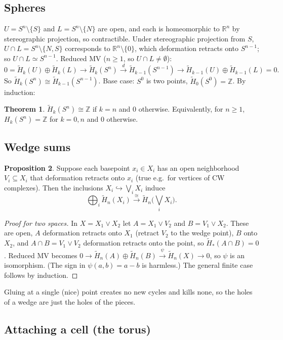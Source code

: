 \documentclass[11pt]{article}
\newcommand{\Z}{\mathbb Z}
\newcommand{\R}{\mathbb R}
\newcommand{\Hred}{\tilde H}
\newcommand{\fig}[2]{\begin{center}\resizebox{#2}{!}{}\end{center}}
\theoremstyle{definition}
\newtheorem{thm}{Theorem}[section]
\newtheorem{prop}[thm]{Proposition}
\begin{document}
\subsection{Spheres}
\fig{mv-sphere}{0.6\textwidth}
$U=S^n\setminus\{S\}$ and $L=S^n\setminus\{N\}$ are open, and each is homeomorphic to $\R^n$ by stereographic projection, so contractible. Under stereographic projection from $S$, $U\cap L=S^n\setminus\{N,S\}$ corresponds to $\R^n\setminus\{0\}$, which deformation retracts onto $S^{n-1}$; so $U\cap L\simeq S^{n-1}$. Reduced MV ($n\ge1$, so $U\cap L\neq\emptyset$):
\[0=\Hred_k(U)\oplus\Hred_k(L)\to\Hred_k(S^n)\xrightarrow{d}\Hred_{k-1}(S^{n-1})\to\Hred_{k-1}(U)\oplus\Hred_{k-1}(L)=0.\]
So $\Hred_k(S^n)\cong\Hred_{k-1}(S^{n-1})$. Base case: $S^0$ is two points, $\Hred_0(S^0)=\Z$. By induction:
\begin{thm}
$\Hred_k(S^n)\cong\Z$ if $k=n$ and $0$ otherwise. Equivalently, for $n\ge1$, $H_k(S^n)=\Z$ for $k=0,n$ and $0$ otherwise.
\end{thm}

\subsection{Wedge sums}
\begin{prop}
Suppose each basepoint $x_i\in X_i$ has an open neighborhood $V_i\subseteq X_i$ that deformation retracts onto $x_i$ (true e.g.\ for vertices of CW complexes). Then the inclusions $X_i\hookrightarrow\bigvee_iX_i$ induce
\[\bigoplus_i\Hred_n(X_i)\xrightarrow{\ \cong\ }\Hred_n\Big(\bigvee_iX_i\Big).\]
\end{prop}
\begin{proof}[Proof for two spaces]
In $X=X_1\vee X_2$ let $A=X_1\vee V_2$ and $B=V_1\vee X_2$. These are open, $A$ deformation retracts onto $X_1$ (retract $V_2$ to the wedge point), $B$ onto $X_2$, and $A\cap B=V_1\vee V_2$ deformation retracts onto the point, so $\Hred_*(A\cap B)=0$. Reduced MV becomes $0\to\Hred_n(A)\oplus\Hred_n(B)\xrightarrow{\psi}\Hred_n(X)\to0$, so $\psi$ is an isomorphism. (The sign in $\psi(a,b)=a-b$ is harmless.) The general finite case follows by induction.
\end{proof}
\begin{intuition}
Gluing at a single (nice) point creates no new cycles and kills none, so the holes of a wedge are just the holes of the pieces.
\end{intuition}

\subsection{Attaching a cell (the torus)}\label{sec:cell}
\end{document}
